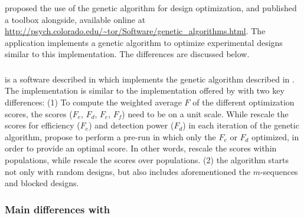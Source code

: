 \documentclass[article]{jss}
\begin{document}
\subsubsection[Genetic algorithm]{}

\citet{Wager2003-hy} proposed the use of the genetic algorithm for
design optimization, and published a  toolbox
alongside, available online at
\url{http://psych.colorado.edu/~tor/Software/genetic_algorithms.html}.
The application implements a genetic algorithm to optimize
experimental designs similar to this implementation.  The differences
are discussed below.

\subsubsection[ER-fMRI]{}

 is a software described in \citet{Kao2009} which
implements the genetic algorithm described in \citet{Kao2009-yo}.  The
implementation is similar to the implementation offered by
\citet{Wager2003-hy} with two key differences: (1) To compute the
weighted average $F$ of the different optimization scores, the
scores ($F_e$, $F_d$, $F_c$, $F_f$) need to be on a unit scale.  While
\citet{Wager2003-hy} rescale the scores for efficiency ($F_e$) and
detection power ($F_d$) in each iteration of the genetic algorithm,
\citet{Kao2009-yo} propose to perform a pre-run in which only the $F_e$
or $F_d$ optimized, in order to provide an optimal score.  In other
words, \citet{Wager2003-hy} rescale the scores within populations,
while \citet{Kao2009-yo} rescale the scores over populations. (2) the
algorithm starts not only with random designs, but also includes
aforementioned the $m$-sequences and blocked designs.

\subsubsection[Main differences with neurodesign]{Main differences
  with }
\end{document}
